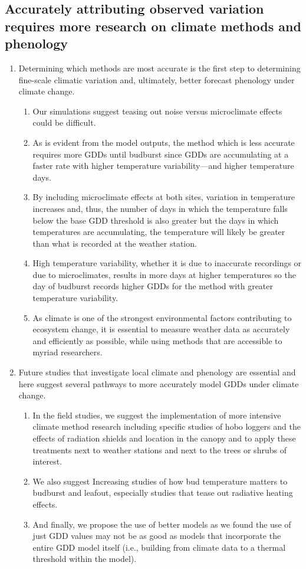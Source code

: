 \documentclass{article}\usepackage[]{graphicx}\usepackage[]{color}
\begin{document}
\subsection*{Accurately attributing observed variation requires more research on climate methods and phenology} 
  \begin{enumerate} 
\item Determining which methods are most accurate is the first step to determining fine-scale climatic variation and, ultimately, better forecast phenology under climate change.
  \begin{enumerate} 
  \item Our simulations suggest teasing out noise versus microclimate effects could be difficult.
  \item As is evident from the model outputs, the method which is less accurate requires more GDDs until budburst since GDDs are accumulating at a faster rate with higher temperature variability---and higher temperature days.
  \item By including microclimate effects at both sites, variation in temperature increases and, thus, the number of days in which the temperature falls below the base GDD threshold is also greater but the days in which temperatures are accumulating, the temperature will likely be greater than what is recorded at the weather station.
  \item High temperature variability, whether it is due to inaccurate recordings or due to microclimates, results in more days at higher temperatures so the day of budburst records higher GDDs for the method with greater temperature variability. 
  \item As climate is one of the strongest environmental factors contributing to ecosystem change, it is essential to measure weather data as accurately and efficiently as possible, while using methods that are accessible to myriad researchers.
  \end{enumerate}
  
\item Future studies that investigate local climate and phenology are essential and here suggest several pathways to more accurately model GDDs under climate change.
    \begin{enumerate} 
    \item In the field studies, we suggest the implementation of more intensive climate method research including specific studies of hobo loggers and the effects of radiation shields and location in the canopy and to apply these treatments next to weather stations and next to the trees or shrubs of interest. 
    \item We also suggest Increasing studies of how bud temperature matters to budburst and leafout, especially studies that tease out radiative heating effects.
    \item And finally, we propose the use of better models as we found the use of just GDD values may not be as good as models that incorporate the entire GDD model itself (i.e., building from climate data to a thermal threshold within the model).
  \end{enumerate}
  

\end{enumerate}
\end{document}
